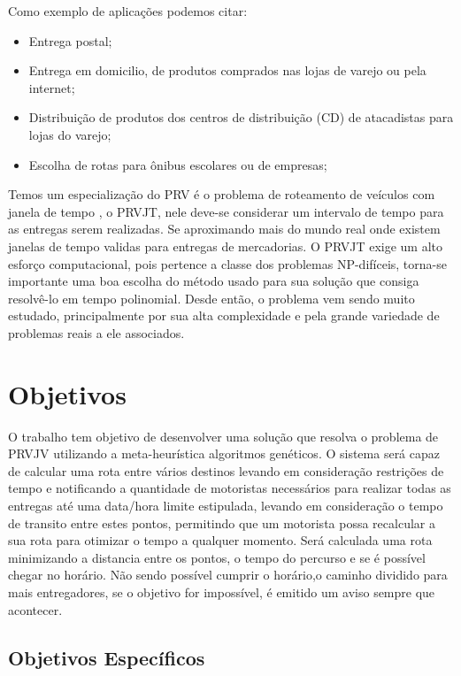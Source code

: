 Como exemplo de aplicações podemos citar:
\begin{itemize}
	\item Entrega postal;
	\item Entrega em domicilio, de produtos comprados nas lojas de varejo ou pela internet;
	\item Distribuição de produtos dos centros de distribuição (CD) de atacadistas para lojas do varejo;
	\item Escolha de rotas para ônibus escolares ou de empresas;
\end{itemize}

Temos um especialização do PRV é o problema de roteamento de veículos com janela de tempo , o PRVJT, nele deve-se considerar um intervalo de tempo para as entregas serem realizadas. Se aproximando mais do mundo real onde existem janelas de tempo validas para entregas de mercadorias.
O PRVJT exige um alto esforço computacional, pois pertence a classe dos problemas NP-difíceis, torna-se importante uma boa escolha do método usado para sua solução que consiga resolvê-lo em tempo polinomial.
Desde então, o problema vem sendo muito estudado, principalmente por sua alta complexidade e pela grande variedade de problemas reais a ele associados.

\section{Objetivos}

O trabalho tem objetivo de desenvolver uma solução que resolva o problema de PRVJV utilizando a meta-heurística algoritmos genéticos. 
O sistema será capaz de calcular uma rota entre vários destinos levando em consideração restrições de tempo e notificando a quantidade de motoristas necessários para realizar todas as entregas até uma data/hora limite estipulada, levando em consideração o tempo de transito entre estes pontos, permitindo que um motorista possa recalcular a sua rota para otimizar o tempo a qualquer momento.
Será calculada uma rota minimizando a distancia entre os pontos, o tempo do percurso e se é possível chegar no horário.
Não sendo possível cumprir o horário,o caminho dividido para mais entregadores, se o objetivo for impossível, é emitido um aviso sempre que acontecer.

\subsection{Objetivos Específicos}

